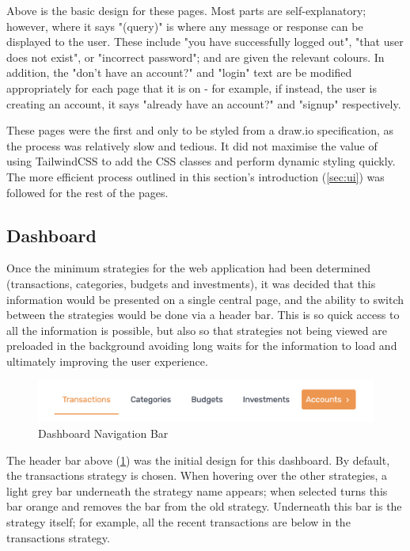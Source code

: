 Above is the basic design for these pages. Most parts are self-explanatory; however, where it says "(query)" is where any message or response can be displayed to the user. These include "you have successfully logged out", "that user does not exist", or "incorrect password"; and are given the relevant colours. In addition, the "don't have an account?" and "login" text are be modified appropriately for each page that it is on - for example, if instead, the user is creating an account, it says "already have an account?" and "signup" respectively.

These pages were the first and only to be styled from a draw.io specification, as the process was relatively slow and tedious. It did not maximise the value of using TailwindCSS to add the CSS classes and perform dynamic styling quickly. The more efficient process outlined in this section's introduction (\ref{sec:ui}) was followed for the rest of the pages.

\subsection{Dashboard}
Once the minimum strategies for the web application had been determined (transactions, categories, budgets and investments), it was decided that this information would be presented on a single central page, and the ability to switch between the strategies would be done via a header bar. This is so quick access to all the information is possible, but also so that strategies not being viewed are preloaded in the background avoiding long waits for the information to load and ultimately improving the user experience.

\begin{figure}[H]
	\centering
	\includegraphics[width=\textwidth]{images/Header_nav_bar.png}
	\caption{Dashboard Navigation Bar}
	\label{fig:DashboardNavigationBar}
\end{figure}

The header bar above (\ref{fig:DashboardNavigationBar}) was the initial design for this dashboard. By default, the transactions strategy is chosen. When hovering over the other strategies, a light grey bar underneath the strategy name appears; when selected turns this bar orange and removes the bar from the old strategy. Underneath this bar is the strategy itself; for example, all the recent transactions are below in the transactions strategy.

